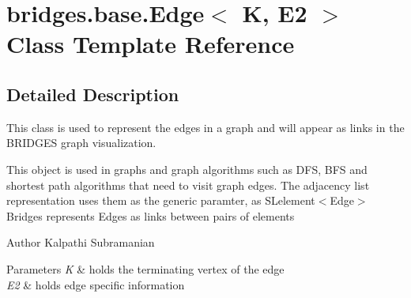 \hypertarget{classbridges_1_1base_1_1_edge}{}\section{bridges.\+base.\+Edge$<$ K, E2 $>$ Class Template Reference}
\label{classbridges_1_1base_1_1_edge}


\subsection{Detailed Description}
This class is used to represent the edges in a graph and will appear as links in the B\+R\+I\+D\+G\+ES graph visualization. 

This object is used in graphs and graph algorithms such as D\+FS, B\+FS and shortest path algorithms that need to visit graph edges. The adjacency list representation uses them as the generic paramter, as S\+Lelement$<$\+Edge$>$ Bridges represents Edges as links between pairs of elements

\begin{DoxyAuthor}{Author}
Kalpathi Subramanian
\end{DoxyAuthor}

\begin{DoxyParams}{Parameters}
{\em K} & holds the terminating vertex of the edge \\
\hline
{\em E2} & holds edge specific information \\
\hline
\end{DoxyParams}
